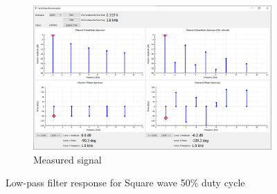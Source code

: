 \documentclass[notitlepage, a4paper, 11pt]{article}
\begin{document}
\begin{figure}[H]
\begin{subfigure}[][][t]{0.45\textwidth}
			\includegraphics[width=\textwidth, trim=10 80 10 100, clip]{../img/Circuit1/dut50}
			\caption{Measured signal}
		\end{subfigure}
		\caption{Low-pass filter response for Square wave 50\% duty cycle}
	\end{figure}
	
\end{document}
